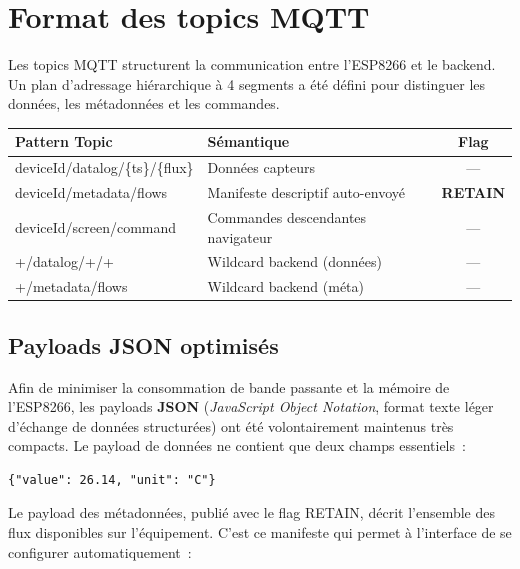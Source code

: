 \documentclass[12pt, a4paper]{report}
\begin{document}
\section{Format des topics MQTT}

Les topics MQTT structurent la communication entre l'ESP8266 et le
backend. Un plan d'adressage hi\'erarchique \`a 4 segments a \'et\'e
d\'efini pour distinguer les donn\'ees, les m\'etadonn\'ees et les
commandes.

\begin{infobox}
\renewcommand{\arraystretch}{1.4}
\begin{tabularx}{\linewidth}{>{\ttfamily\footnotesize}l
                             >{\raggedright\arraybackslash}X c}
\toprule
\textnormal{\textbf{Pattern Topic}} & \textbf{S\'emantique} & \textbf{Flag} \\
\midrule
deviceId/datalog/\{ts\}/\{flux\} & Donn\'ees capteurs & --- \\
deviceId/metadata/flows & Manifeste descriptif auto-envoy\'e & \textbf{RETAIN} \\
deviceId/screen/command & Commandes descendantes navigateur & --- \\
+/datalog/+/+ & Wildcard backend (donn\'ees) & --- \\
+/metadata/flows & Wildcard backend (m\'eta) & --- \\
\bottomrule
\end{tabularx}
\end{infobox}

\subsection{Payloads JSON optimis\'es}

Afin de minimiser la consommation de bande passante et la m\'emoire
de l'ESP8266, les payloads \textbf{JSON} (\textit{JavaScript Object
Notation}, format texte l\'eger d'\'echange de donn\'ees structur\'ees)
ont \'et\'e volontairement maintenus tr\`es compacts. Le payload de donn\'ees ne contient
que deux champs essentiels~:

\begin{lstlisting}[caption={Payload de donn\'ees (38 octets)},
                  label={lst:payload_data}]
{"value": 26.14, "unit": "C"}
\end{lstlisting}

Le payload des m\'etadonn\'ees, publi\'e avec le flag RETAIN, d\'ecrit
l'ensemble des flux disponibles sur l'\'equipement. C'est ce manifeste
qui permet \`a l'interface de se configurer automatiquement~:
\end{document}
